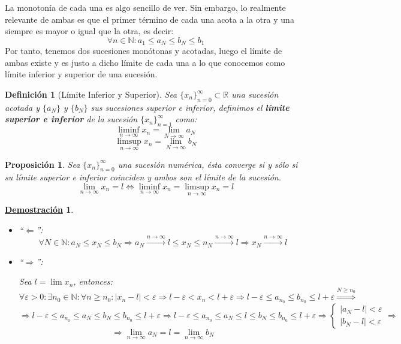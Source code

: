 \documentclass[10pt,a4paper,openright]{book}
\theoremstyle{break}
\newtheorem{defi}{Definición}[chapter]
\newtheorem{prop}{Proposición}[chapter]
\newtheorem*{demo}{\underline{Demostración}}
\begin{document}
La monotonía de cada una es algo sencillo de ver. Sin embargo, lo realmente relevante de ambas es que el primer término de cada una acota a la otra y una siempre es mayor o igual que la otra, es decir:
\[
\forall n\in \mathbb N: a_1\leq a_N\leq b_N\leq b_1
\]
Por tanto, tenemos dos sucesiones monótonas y acotadas, luego el límite de ambas existe y es justo a dicho límite de cada una a lo que conocemos como límite inferior y superior de una sucesión.

\begin{defi}[Límite Inferior y Superior]
Sea $\{x_n\}_{n=0}^\infty\subset \mathbb R$ una sucesión acotada y $\{a_N\}$ y $\{b_N\}$ sus sucesiones superior e inferior, definimos el \textbf{límite superior e inferior} de la sucesión $\{x_n\}_{n=1}^\infty$ como:
$$\liminf_{n\rightarrow\infty}x_n=\lim_{N\rightarrow\infty}a_N$$
$$\limsup_{n\rightarrow\infty}x_n=\lim_{N\rightarrow\infty}b_N$$
\end{defi}

\begin{prop}
Sea $\{x_n\}_{n=0}^\infty$ una sucesión numérica, ésta converge si y sólo si su límite superior e inferior coinciden y ambos son el límite de la sucesión.
\[
\lim_{n\rightarrow \infty}x_n=l\Leftrightarrow \liminf_{n\rightarrow\infty}x_n= \limsup_{n\rightarrow\infty}x_n=l
\]
\end{prop}
\begin{demo}
\begin{itemize}
\item ``$\Leftarrow$'':
$$\forall N\in \mathbb N: a_N\leq x_N \leq b_N\Rightarrow a_N\xrightarrow{n\rightarrow\infty} l\leq x_N\leq n_N\xrightarrow{n\rightarrow\infty} l\Rightarrow x_N\xrightarrow{n\rightarrow\infty} l$$

\item ``$\Rightarrow$'':\par
Sea $l=\lim x_n$, entonces:
$$\forall \varepsilon>0: \exists n_0\in \mathbb N : \forall n\geq n_0: |x_n-l|<\varepsilon\Rightarrow l-\varepsilon <x_n<l+\varepsilon\Rightarrow l-\varepsilon \leq a_{n_0} \leq b_{n_0}\leq l+\varepsilon\stackrel{N\geq n_0}{\Rightarrow}$$
$$\Rightarrow l-\varepsilon \leq a_{n_0} \leq a_N \leq b_N \leq b_{n_0} \leq l+\varepsilon\Rightarrow l-\varepsilon \leq a_{n_0} \leq a_N \leq l\leq b_N \leq b_{n_0} \leq l+\varepsilon\Rightarrow \begin{cases}|a_N-l|<\varepsilon \\ |b_N-l|<\varepsilon \end{cases}\Rightarrow$$
$$\Rightarrow \lim_{n\rightarrow\infty}a_N=l= \lim_{n\rightarrow\infty}b_N$$
\end{itemize}
\end{demo}
\end{document}
